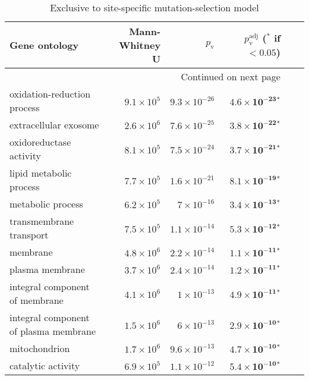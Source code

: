 \begin{longtable}{|l|r|r|r|r|r|}
    \caption{Exclusive to site-specific mutation-selection model} \\
    \toprule
    Gene ontology                             & Mann-Whitney U     & $p_{\mathrm{v}}$     & $p_{\mathrm{v}}^{\mathrm{adj}}$ ($\bm{^*}$ if $ < 0.05$) \\
    \midrule
    \endhead
    \midrule
    \multicolumn{4}{r}{{Continued on next page}} \\
    \midrule
    \endfoot

    \bottomrule
    \endlastfoot
    oxidation-reduction process               & $9.1\times 10^{5}$ & $9.3\times 10^{-26}$ & $\bm{4.6\times 10^{-23}{^*}}$   \\
    extracellular exosome                     & $2.6\times 10^{6}$ & $7.6\times 10^{-25}$ & $\bm{3.8\times 10^{-22}{^*}}$   \\
    oxidoreductase activity                   & $8.1\times 10^{5}$ & $7.5\times 10^{-24}$ & $\bm{3.7\times 10^{-21}{^*}}$   \\
    lipid metabolic process                   & $7.7\times 10^{5}$ & $1.6\times 10^{-21}$ & $\bm{8.1\times 10^{-19}{^*}}$   \\
    metabolic process                         & $6.2\times 10^{5}$ & $ 7\times 10^{-16}$  & $\bm{3.4\times 10^{-13}{^*}}$   \\
    transmembrane transport                   & $7.5\times 10^{5}$ & $1.1\times 10^{-14}$ & $\bm{5.3\times 10^{-12}{^*}}$   \\
    membrane                                  & $4.8\times 10^{6}$ & $2.2\times 10^{-14}$ & $\bm{1.1\times 10^{-11}{^*}}$   \\
    plasma membrane                           & $3.7\times 10^{6}$ & $2.4\times 10^{-14}$ & $\bm{1.2\times 10^{-11}{^*}}$   \\
    integral component of membrane            & $4.1\times 10^{6}$ & $ 1\times 10^{-13}$  & $\bm{4.9\times 10^{-11}{^*}}$   \\
    integral component of plasma membrane     & $1.5\times 10^{6}$ & $ 6\times 10^{-13}$  & $\bm{2.9\times 10^{-10}{^*}}$   \\
    mitochondrion                             & $1.7\times 10^{6}$ & $9.6\times 10^{-13}$ & $\bm{4.7\times 10^{-10}{^*}}$   \\
    catalytic activity                        & $6.9\times 10^{5}$ & $1.1\times 10^{-12}$ & $\bm{5.4\times 10^{-10}{^*}}$   \\

\end{longtable}
